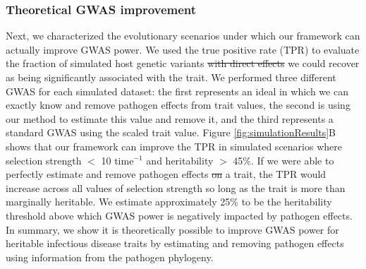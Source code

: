\documentclass[11pt]{article} %
\providecommand{\DIFadd}[1]{{\protect\color{blue}\uwave{#1}}} %
\providecommand{\DIFdel}[1]{{\protect\color{red}\sout{#1}}}                      %
\providecommand{\DIFaddbegin}{} %
\providecommand{\DIFaddend}{} %
\providecommand{\DIFdelbegin}{} %
\providecommand{\DIFdelend}{} %
\newcommand{\DIFscaledelfig}{0.5}
\newlength{\DIFdelgraphicswidth} %
\newlength{\DIFdelgraphicsheight} %
\newcommand{\DIFaddincludegraphics}[2][]{{\color{blue}\fbox{\DIFOincludegraphics[#1]{#2}}}} %
\newcommand{\DIFdelincludegraphics}[2][]{%
\sbox{\DIFdelgraphicsbox}{\DIFOincludegraphics[#1]{#2}}%
\settoboxwidth{\DIFdelgraphicswidth}{\DIFdelgraphicsbox} %
\settoboxtotalheight{\DIFdelgraphicsheight}{\DIFdelgraphicsbox} %
\scalebox{\DIFscaledelfig}{%
\parbox[b]{\DIFdelgraphicswidth}{\usebox{\DIFdelgraphicsbox}\\[-\baselineskip] \rule{\DIFdelgraphicswidth}{0em}}\llap{\resizebox{\DIFdelgraphicswidth}{\DIFdelgraphicsheight}{%
\setlength{\unitlength}{\DIFdelgraphicswidth}%
\begin{picture}(1,1)%
\thicklines\linethickness{2pt} %
{\color[rgb]{1,0,0}\put(0,0){\framebox(1,1){}}}%
{\color[rgb]{1,0,0}\put(0,0){\line( 1,1){1}}}%
{\color[rgb]{1,0,0}\put(0,1){\line(1,-1){1}}}%
\end{picture}%
}\hspace*{3pt}}} %
} %
\DeclareRobustCommand{\DIFaddbegin}{\DIFOaddbegin \let\includegraphics\DIFaddincludegraphics} %
\DeclareRobustCommand{\DIFaddend}{\DIFOaddend \let\includegraphics\DIFOincludegraphics} %
\DeclareRobustCommand{\DIFdelbegin}{\DIFOdelbegin \let\includegraphics\DIFdelincludegraphics} %
\DeclareRobustCommand{\DIFdelend}{\DIFOaddend \let\includegraphics\DIFOincludegraphics} %
\begin{document}
\begin{linenumbers}
\subsubsection*{Theoretical GWAS improvement}

Next, we characterized the evolutionary scenarios under which our framework can actually improve GWAS power. We used the true positive rate (TPR) to evaluate the fraction of simulated \DIFaddbegin \DIFadd{causal }\DIFaddend host genetic variants \DIFdelbegin \DIFdel{with direct effects }\DIFdelend we could recover as being significantly associated with the trait. We performed three different GWAS for each simulated dataset: the first represents an ideal in which we can exactly know and remove pathogen effects from trait values, the second is using our method to estimate this value and remove it, and the third represents a standard GWAS using the scaled trait value. Figure \ref{fig:simulationResults}B shows that our framework can improve the TPR in simulated scenarios where selection strength $<$ 10 time$^{-1}$ and heritability $>$ 45\%. If we were able to perfectly estimate and remove pathogen effects \DIFdelbegin \DIFdel{on }\DIFdelend \DIFaddbegin \DIFadd{from }\DIFaddend a trait, the TPR would increase across all values of selection strength so long as the trait is more than marginally heritable. We estimate approximately 25\% to be the heritability threshold above which GWAS power is negatively impacted by pathogen effects. In summary, we show \DIFaddbegin \DIFadd{that }\DIFaddend it is theoretically possible to improve GWAS power for heritable infectious disease traits by estimating and removing pathogen effects using information from the pathogen phylogeny.



\end{linenumbers}
\end{document}
